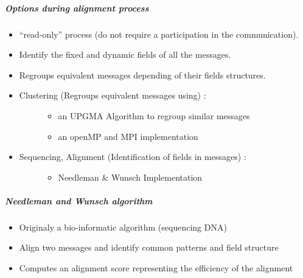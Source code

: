 \documentclass[letterpaper,10pt,english]{sphinxmanual}
\begin{document}
\subparagraph{Options during alignment process}
\label{modelization/vocabular:options-during-alignment-process}\begin{itemize}
\item {} 
``read-only” process (do not require a participation in the
communication).

\item {} 
Identify the fixed and dynamic fields of all the messages.

\item {} 
Regroups equivalent messages depending of their fields structures.

\item {} \begin{description}
\item[{Clustering (Regroups equivalent messages using) :}] \leavevmode\begin{itemize}
\item {} 
an UPGMA Algorithm to regroup similar messages

\item {} 
an openMP and MPI implementation

\end{itemize}

\end{description}

\item {} \begin{description}
\item[{Sequencing, Alignment (Identification of fields in messages) :}] \leavevmode\begin{itemize}
\item {} 
Needleman \& Wunsch Implementation

\end{itemize}

\end{description}

\end{itemize}


\subparagraph{Needleman and Wunsch algorithm}
\label{modelization/vocabular:needleman-and-wunsch-algorithm}\begin{itemize}
\item {} 
Originaly a bio-informatic algorithm (sequencing DNA)

\item {} 
Align two messages and identify common patterns and field structure

\item {} 
Computes an alignment score representing the efficiency of the
alignment

\end{itemize}
\end{document}
